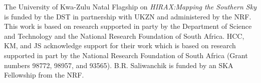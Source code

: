 \documentclass[]{spie}  %
\begin{document}
\label{sec:conc}



   

\acknowledgments %
 
The University of Kwa-Zulu Natal Flagship on \textit{HIRAX:Mapping the Southern Sky} is funded by the DST in partnership with UKZN and administered by the NRF. This work is based on research supported in party by the Department of Science and Technology and the National Research Foundation of South Africa. HCC, KM, and JS acknowledge support for their work which is based on research supported in part by the National Research Foundation of South Africa (Grant numbers 98772, 98957, and 93565). B.R. Saliwanchik is funded by an SKA Fellowship from the NRF.

\end{document}

